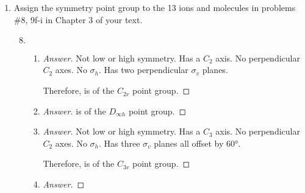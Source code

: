 \documentclass[../psets.tex]{subfiles}
\begin{document}
\begin{enumerate}[label={\Roman*)}]
\begin{enumerate}[label={\textbf{3.\arabic*}}]
\begin{center}
        \end{center}
        \setcounter{enumii}{28}
        \item Sketch the most likely structure of  and explain your reasoning.
        \begin{center}
        \end{center}
        \begin{proof}[Answer]
            Bromine is more electropositive than chlorine. Thus, by Bent's rule, the bromines will bond to the hybrid orbitals with greater $s$-character (the equatorial $sp^2$ ones) first.
        \end{proof}
    \end{enumerate}
    \newpage
    \item Assign the symmetry point group to the 13 ions and molecules in problems \#8, 9f-i in Chapter 3 of your text.
    \begin{enumerate}[label={\textbf{3.\arabic*}}]
        \setcounter{enumii}{7}
        \item ${\color{white}x}$
        \begin{enumerate}[label={\textbf{\alph*.}}]
            \item {}
            \begin{proof}[Answer]
                Not low or high symmetry. Has a $C_2$ axis. No perpendicular $C_2$ axes. No $\sigma_h$. Has two perpendicular $\sigma_v$ planes.\par
                Therefore,  is of the $\boxed{C_{2v}}$ point group.
            \end{proof}
            \item {}
            \begin{proof}[Answer]
                 is of the $\boxed{D_{\infty h}}$ point group.
            \end{proof}
            \item {}
            \begin{proof}[Answer]
                Not low or high symmetry. Has a $C_3$ axis. No perpendicular $C_2$ axes. No $\sigma_h$. Has three $\sigma_v$ planes all offset by $\ang{60}$.\par
                Therefore,  is of the $\boxed{C_{3v}}$ point group.
            \end{proof}
            \item {}
            \begin{proof}[Answer]

\end{proof}
\end{enumerate}
\end{enumerate}
\end{enumerate}
\end{document}
